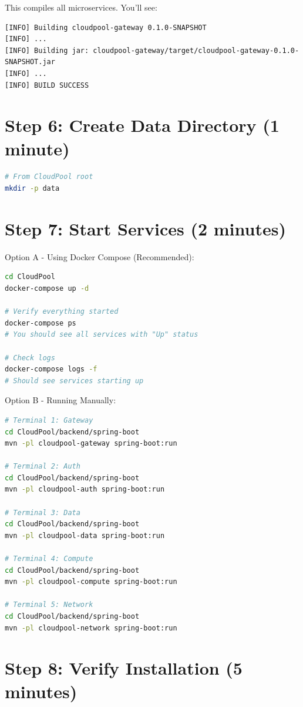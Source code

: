 \documentclass[11pt,a4paper]{report}
\begin{document}
This compiles all microservices. You'll see:

\begin{lstlisting}[language=text]
[INFO] Building cloudpool-gateway 0.1.0-SNAPSHOT
[INFO] ...
[INFO] Building jar: cloudpool-gateway/target/cloudpool-gateway-0.1.0-SNAPSHOT.jar
[INFO] ...
[INFO] BUILD SUCCESS
\end{lstlisting}


\section{Step 6: Create Data Directory (1 minute)}


\begin{lstlisting}[language=bash]
# From CloudPool root
mkdir -p data
\end{lstlisting}


\section{Step 7: Start Services (2 minutes)}


Option A - Using Docker Compose (Recommended):

\begin{lstlisting}[language=bash]
cd CloudPool
docker-compose up -d

# Verify everything started
docker-compose ps
# You should see all services with "Up" status

# Check logs
docker-compose logs -f
# Should see services starting up
\end{lstlisting}

Option B - Running Manually:

\begin{lstlisting}[language=bash]
# Terminal 1: Gateway
cd CloudPool/backend/spring-boot
mvn -pl cloudpool-gateway spring-boot:run

# Terminal 2: Auth
cd CloudPool/backend/spring-boot
mvn -pl cloudpool-auth spring-boot:run

# Terminal 3: Data
cd CloudPool/backend/spring-boot
mvn -pl cloudpool-data spring-boot:run

# Terminal 4: Compute
cd CloudPool/backend/spring-boot
mvn -pl cloudpool-compute spring-boot:run

# Terminal 5: Network
cd CloudPool/backend/spring-boot
mvn -pl cloudpool-network spring-boot:run
\end{lstlisting}


\section{Step 8: Verify Installation (5 minutes)}
\end{document}
